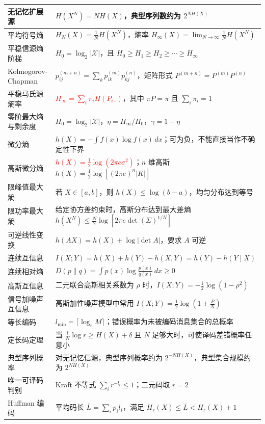 {\begin{longtable}{@{}p{}p{}@{}}
\midrule
无记忆扩展源 & $H(X^N)=NH(X)$，典型序列数约为 $2^{NH(X)}$ \\
\midrule
平均符号熵 & $H_N(X)=\frac1NH(X^N)$，熵率 $H_\infty(X)=\lim_{N\to\infty}\frac1NH(X^N)$ \\
\midrule
平稳信源熵阶梯 & $H_0=\log_2|\mathcal X|$，且 $H_0\ge H_1\ge H_2\ge\cdots\ge H_\infty$ \\
\midrule
Kolmogorov-Chapman & $p_{ij}^{(m+n)}=\sum_kp_{ik}^{(m)}p_{kj}^{(n)}$，矩阵形式 $P^{(m+n)}=P^{(m)}P^{(n)}$ \\
\midrule
平稳马氏源熵率 & \textcolor{Red}{$H_\infty=\sum_i\pi_iH(P_{i\cdot})$}，其中 $\pi P=\pi$ 且 $\sum_i\pi_i=1$ \\
\midrule
零阶最大熵与剩余度 & $H_0=\log_2|\mathcal X|$，$\eta=H_\infty/H_0$，$\gamma=1-\eta$ \\
\midrule
微分熵 & $h(X)=-\int f(x)\log f(x)\,dx$；可为负，不能直接当作不确定性下界 \\
\midrule
高斯微分熵 & \textcolor{Red}{$h(X)=\frac12\log(2\pi e\sigma^2)$}；$n$ 维高斯 $h(X)=\frac12\log[(2\pi e)^n|K|]$ \\
\midrule
限峰值最大熵 & 若 $X\in[a,b]$，则 $h(X)\le\log(b-a)$，均匀分布达到等号 \\
\midrule
限功率最大熵 & 给定协方差约束时，高斯分布达到最大差熵 $h(X^N)\le\frac N2\log[2\pi e\det(\Sigma)^{1/N}]$ \\
\midrule
可逆线性变换 & $h(AX)=h(X)+\log|\det A|$，要求 $A$ 可逆 \\
\midrule
连续互信息 & $I(X;Y)=h(X)+h(Y)-h(X,Y)=h(Y)-h(Y\mid X)$ \\
\midrule
连续相对熵 & $D(p\|q)=\int p(x)\log\frac{p(x)}{q(x)}\,dx\ge0$ \\
\midrule
高斯互信息 & 二元联合高斯相关系数为 $\rho$ 时，$I(X;Y)=-\frac12\log(1-\rho^2)$ \\
\midrule
信号加噪声互信息 & 高斯加性噪声模型中常用 $I(X;Y)=\frac12\log\left(1+\frac PN\right)$ \\
\midrule
等长编码 & $l_{\min}=\lceil\log_rM\rceil$；错误概率为未被编码消息集合的总概率 \\
\midrule
定长码定理 & 当 $\frac lN\log r\ge H(X)+\delta$ 且 $N$ 足够大时，可使译码差错概率任意小 \\
\midrule
典型序列概率 & 对无记忆信源，典型序列概率约为 $2^{-NH(X)}$，典型集合规模约为 $2^{NH(X)}$ \\
\midrule
唯一可译码判别 & Kraft 不等式 $\sum_ir^{-l_i}\le1$；二元码取 $r=2$ \\
\midrule
Huffman 编码 & 平均码长 $\bar L=\sum_ip_il_i$，满足 $H_r(X)\le\bar L< H_r(X)+1$ \\

\end{longtable}}
